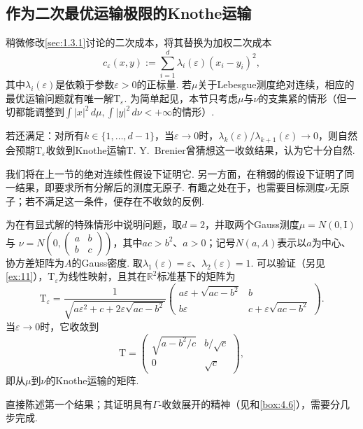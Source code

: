 \subsection{作为二次最优运输极限的Knothe运输}\label{sec:2.4}

稍微修改\autoref{sec:1.3.1}讨论的二次成本，将其替换为加权二次成本
\[
c_\varepsilon(x,y):=\sum_{i=1}^d\lambda_i(\varepsilon)(x_i-y_i)^2,
\]
其中$\lambda_i(\varepsilon)$是依赖于参数$\varepsilon>0$的正标量. 若$\mu$关于Lebesgue测度绝对连续，相应的最优运输问题就有唯一解$\mathrm T_\varepsilon$. 为简单起见，本节只考虑$\mu$与$\nu$的支集紧的情形（但一切都能调整到$\int|x|^2\,d\mu,\int|y|^2\,d\nu<+\infty$的情形）.

若还满足：对所有$k\in\{1,\ldots,d-1\}$，当$\varepsilon\to0$时，$\lambda_k(\varepsilon)/\lambda_{k+1}(\varepsilon)\to0$，则自然会预期$\mathrm T_\varepsilon$收敛到Knothe运输$\mathrm T$. Y.~Brenier曾猜想这一收敛结果，认为它十分自然.

我们将在上一节的绝对连续性假设下证明它. 另一方面，\cite{b114}在稍弱的假设下证明了同一结果，即要求所有分解后的测度无原子. 有趣之处在于，也需要目标测度$\nu$无原子；若不满足这一条件，便存在不收敛的反例.

\begin{example}[Gauss测度的显式计算]\label{obj:2.22}
为在有显式解的特殊情形中说明问题，取$d=2$，并取两个Gauss测度$\mu=N(0,\mathrm I)$与
$\nu=N\!\left(0,\begin{pmatrix}a&b\\b&c\end{pmatrix}\right)$，其中$ac>b^2$、$a>0$；记号$N(a,A)$表示以$a$为中心、协方差矩阵为$A$的Gauss密度. 取$\lambda_1(\varepsilon)=\varepsilon$、$\lambda_2(\varepsilon)=1$. 可以验证（另见\autoref{ex:11}），$\mathrm T_\varepsilon$为线性映射，且其在$\mathbb R^2$标准基下的矩阵为
\[
\mathrm T_\varepsilon=
\frac{1}{\sqrt{a\varepsilon^2+c+2\varepsilon\sqrt{ac-b^2}}}
\begin{pmatrix}
a\varepsilon+\sqrt{ac-b^2}&b\\
b\varepsilon&c+\varepsilon\sqrt{ac-b^2}
\end{pmatrix}.
\]
当$\varepsilon\to0$时，它收敛到
\[
\mathrm T=\begin{pmatrix}\sqrt{a-b^2/c}&b/\sqrt c\\0&\sqrt c\end{pmatrix},
\]
即从$\mu$到$\nu$的Knothe运输的矩阵.
\end{example}

直接陈述第一个结果；其证明具有$\Gamma$-收敛展开的精神（见\cite{b77}和\autoref{box:4.6}），需要分几步完成.


